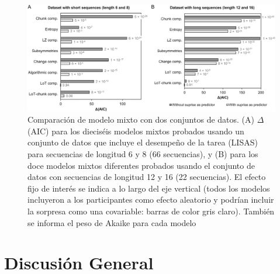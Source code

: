 \begin{figure}[t!]
      \includegraphics[scale=0.8]{figuras/plosbio/journal.pcbi.1008598.g010.PNG}
     
      \centering
     
      \caption{Comparación de modelo mixto con dos conjuntos de datos. (A) $\Delta$ (AIC) para los dieciséis modelos mixtos probados usando un conjunto de datos que incluye el desempeño de la tarea (LISAS) para secuencias de longitud 6 y 8 (66 secuencias), y (B) para los doce modelos mixtos diferentes probados usando el conjunto de datos con secuencias de longitud 12 y 16 (22 secuencias). El efecto fijo de interés se indica a lo largo del eje vertical (todos los modelos incluyeron a los participantes como efecto aleatorio y podrían incluir la sorpresa como una covariable: barras de color gris claro). También se informa el peso de Akaike para cada modelo}
      \label{PlosBIO-F10}
\end{figure}

\section{Discusión General}

